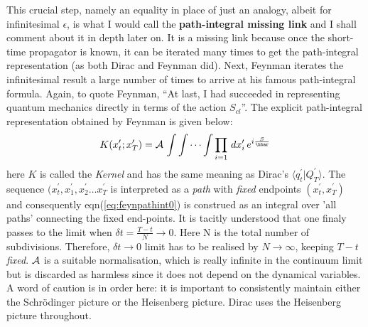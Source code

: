 \documentclass[12pt]{article}
\newcommand{\be}{\begin{equation}}
\newcommand{\ee}{\end{equation}}
\begin{document}
This crucial step, namely an equality in place of just an analogy, albeit for infinitesimal $\epsilon$, is what I would call the 
{\bf path-integral missing link} and I shall comment about it in depth later on. It is a missing 
link because once the short-time propagator is known, it can be iterated many times to get the path-integral representation (as both Dirac
and Feynman did). Next, Feynman iterates the infinitesimal result a large number of times to arrive at his famous path-integral formula. 
Again, to quote Feynman, ``At last, I had succeeded in representing quantum mechanics directly in terms of the action $S_{cl}$''. The
explicit path-integral representation obtained by Feynman is given below:
\be
\label{eq:feynpathint0}
K(x_t^\prime;x_T^\prime) = {\cal A}\,\int\int \cdots  \int \prod_{i=1}\,dx_i^\prime\,e^{i\frac{S}{\hbar}}
\ee
here $K$ is called the {\it Kernel} and has the same meaning as Dirac's $\langle q_t^\prime|Q_T^\prime\rangle$. The sequence 
$(x_t^\prime, x_1^\prime,x_2^\prime \ldots x_T^\prime$ is interpreted as a {\it path} with {\it fixed} endpoints $(x_t^\prime,x_T^\prime)$ 
and consequently eqn(\ref{eq:feynpathint0}) is construed as an
integral over 'all paths' connecting the fixed end-points. It is tacitly understood that one finaly passes to the limit when 
$\delta t = \frac{T - t}{N} \rightarrow 0$. Here N is the total number of subdivisions. Therefore, $\delta t \rightarrow 0$ limit 
has to be realised by $N \rightarrow \infty$, keeping $T - t$ \emph{fixed}. ${\cal A}$ is a suitable normalisation, which is really infinite in the continuum limit but 
is discarded as harmless since it does not depend on the dynamical variables. A word of caution is in order here: it is important to consistently maintain either
the Schr\"odinger picture or the Heisenberg picture. Dirac uses the Heisenberg picture throughout. 
\end{document}
